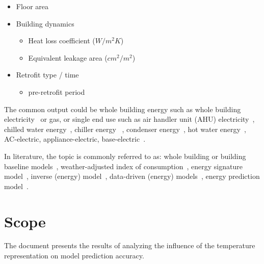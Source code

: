 \documentclass[12pt]{article}
\begin{document}
\begin{itemize}
\begin{itemize}
  \end{itemize}
\item Floor area~\cite{Yu20101637}
\item Building dynamics
  \begin{itemize}
  \item Heat loss coefficient ($W / m^2K$)~\cite{Yu20101637}
  \item Equivalent leakage area ($cm^2 / m^2$)~\cite{Yu20101637}
  \end{itemize}
\item Retrofit type / time
  \begin{itemize}
  \item pre-retrofit period~\cite{kissock2008methodology}
  \end{itemize}
\end{itemize}

The common output could be whole building energy such as whole building
electricity~\cite{haberl1994bin} or gas, or single end use such as air
handler unit (AHU) electricity~\cite{haberl1994bin}, chilled water
energy~\cite{haberl1994bin}, chiller energy
~\cite{abushakra1997inverse}, condenser
energy~\cite{abushakra1997inverse}, hot water
energy~\cite{haberl1994bin, abushakra1997inverse}, AC-electric,
appliance-electric, base-electric~\cite{wytock2013contextually}.


In literature, the topic is commonly referred to as: whole building or
building baseline models~\cite{granderson2014evaluation,
  reddy1997baselining, kissock2008methodology, dong2005applying,
  Zhang2015177}, weather-adjusted index of
consumption~\cite{fels1986prism}, energy signature
model~\cite{rabl1992energy, hammarsten1987critical}, inverse (energy)
model~\cite{kissock2003, abushakra1997inverse, Zhang2015177},
data-driven (energy) models~\cite{Zhang2015177}, energy prediction
model~\cite{mocanu2016deep, Yu20101637, dong2005applying}.

\section{Scope}
The document presents the results of analyzing the influence of the
temperature representation on model prediction accuracy.
\end{document}
